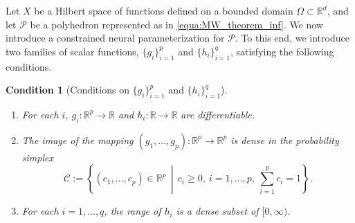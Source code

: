\documentclass{article}
\numberwithin{equation}{section}
\newtheorem{condition}{Condition}[section]
\begin{document}
Let $X$ be a Hilbert space of functions defined on a bounded domain $\Omega\subset \mathbb{R}^d$, and let $\mathcal{P}$ be a polyhedron represented as in \eqref{equa:MW_theorem_inf}. We now introduce a constrained neural parameterization for $\mathcal{P}$. To this end, we introduce two families of scalar functions, $\{g_i\}_{i=1}^p$ and $\{h_i\}_{i=1}^q$, satisfying the following conditions.

\begin{condition}[Conditions on $\{g_i\}_{i=1}^p$ and $\{h_i\}_{i=1}^q$]
\label{conditions}
\leavevmode\par
\begin{enumerate}
    \item For each $i$,  $g_i:\mathbb{R}^p\to\mathbb{R}$ and $h_i:\mathbb{R}\to\mathbb{R}$ are differentiable.
    \item The image of the mapping $(g_1,\dots,g_p):\mathbb{R}^p\to\mathbb{R}^p$ is dense in the probability simplex
    \begin{equation}
        \mathcal{C}:=\left\{(c_1,\dots,c_p)\in\mathbb{R}^p \,\middle|\, c_i\ge 0,\ i=1,\dots,p,\ \sum_{i=1}^p c_i=1\right\}.
    \end{equation}
    \item For each $i=1,\dots,q$, the range of $h_i$ is a dense subset of $[0,\infty)$.
\end{enumerate}
\end{condition}
\end{document}
